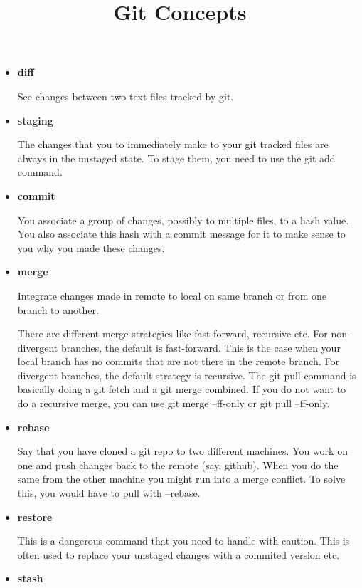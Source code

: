 \documentclass{../template/texnote}
\title{Git Concepts}
\begin{document}
    \maketitle {}

\begin{itemize}
	\item \textbf{diff}

		See changes between two text files tracked by git.
\item \textbf{staging}

The changes that you to immediately make to your git tracked files are always in the unstaged state. To stage them, you need to use the git add command.

\item \textbf{commit}

You associate a group of changes, possibly to multiple files, to a hash value. You also associate this hash with a commit message for it to make sense to you why you made these changes.

\item \textbf{merge}

Integrate changes made in remote to local on same branch or from one branch to another.

There are different merge strategies like fast-forward, recursive etc. For non-divergent branches, the default is fast-forward. This is the case when your local branch has no commits that are not there in the remote branch. For divergent branches, the default strategy is recursive. The git pull command is basically doing a git fetch and a git merge combined. If you do not want to do a recursive merge, you can use git merge --ff-only or git pull --ff-only.

\item \textbf{rebase}

Say that you have cloned a git repo to two different machines. You work on one and push changes back to the remote (say, github). When you do the same from the other machine you might run into a merge conflict. To solve this, you would have to pull with --rebase.

\item \textbf{restore}

This is a dangerous command that you need to handle with caution. This is often used to replace your unstaged changes with a commited version etc.

\item \textbf{stash}


\end{itemize}
\end{document}
